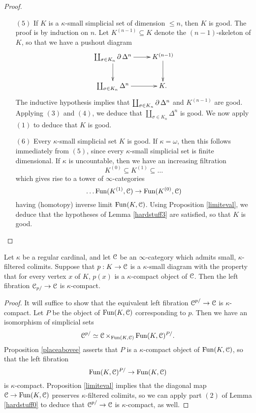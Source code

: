 \begin{proof}
\begin{itemize}
\item[$(5)$] If $K$ is a $\kappa$-small simplicial set of dimension $\leq n$, then $K$ is good. The proof is by induction on $n$. Let
$K^{(n-1)} \subseteq K$ denote the $(n-1)$-skeleton of $K$, so that we have a pushout diagram
$$ \xymatrix{ \coprod_{ \sigma \in K_n} \bd \Delta^n \ar[r] \ar[d] & K^{(n-1)} \ar[d] \\
\coprod_{\sigma \in K_n} \Delta^n \ar[r] & K.}$$
The inductive hypothesis implies that $\coprod_{\sigma \in K_n} \operatorname{\partial} \Delta^n$ and $K^{(n-1)}$
are good. Applying $(3)$ and $(4)$, we deduce that $\coprod_{\sigma \in K_n} \Delta^n$ is good. We now apply $(1)$ to deduce that $K$ is good.

\item[$(6)$] Every $\kappa$-small simplicial set $K$ is good. If $\kappa = \omega$, then this
follows immediately from $(5)$, since every $\kappa$-small simplicial set is finite dimensional.
If $\kappa$ is uncountable, then we have an increasing filtration
$$ K^{(0)} \subseteq K^{(1)} \subseteq \ldots $$
which gives rise to a tower of $\infty$-categories
$$ \ldots \operatorname{Fun}(K^{(1)}, \operatorname{\mathcal{C}}) \rightarrow \operatorname{Fun}(K^{(0)}, \operatorname{\mathcal{C}}) $$
having (homotopy) inverse limit $\operatorname{Fun}(K,\operatorname{\mathcal{C}})$. Using Proposition \ref{limiteval}, we deduce that the hypotheses of Lemma \ref{hardstuff3} are satisfied, so that $K$ is good.
\end{itemize}
\end{proof}

\begin{corollary}\label{jurman}
Let $\kappa$ be a regular cardinal, and let $\operatorname{\mathcal{C}}$ be an $\infty$-category which admits
small, $\kappa$-filtered colimits. Suppose that $p: K \rightarrow \operatorname{\mathcal{C}}$ is a $\kappa$-small diagram with the property that for every vertex $x$ of $K$, $p(x)$ is a $\kappa$-compact object of $\operatorname{\mathcal{C}}$.
Then the left fibration $\operatorname{\mathcal{C}}_{p/} \rightarrow \operatorname{\mathcal{C}}$ is $\kappa$-compact.
\end{corollary}

\begin{proof}
It will suffice to show that the equivalent left fibration $\operatorname{\mathcal{C}}^{p/ } \rightarrow \operatorname{\mathcal{C}}$
is $\kappa$-compact. Let $P$ be the object of $\operatorname{Fun}(K,\operatorname{\mathcal{C}})$ corresponding to $p$. Then
we have an isomorphism of simplicial sets $$\operatorname{\mathcal{C}}^{p/} \simeq \operatorname{\mathcal{C}} \times_{ \operatorname{Fun}(K,\operatorname{\mathcal{C}}) } \operatorname{Fun}(K,\operatorname{\mathcal{C}})^{P/}.$$ Proposition \ref{placeabovee} asserts that $P$ is a $\kappa$-compact object
of $\operatorname{Fun}(K,\operatorname{\mathcal{C}})$, so that the left fibration $$\operatorname{Fun}(K,\operatorname{\mathcal{C}})^{P/} \rightarrow \operatorname{Fun}(K,\operatorname{\mathcal{C}})$$ is $\kappa$-compact.
Proposition \ref{limiteval} implies that the diagonal map $\operatorname{\mathcal{C}} \rightarrow \operatorname{Fun}(K,\operatorname{\mathcal{C}})$ preserves $\kappa$-filtered colimits, so we can apply part $(2)$ of Lemma \ref{hardstuff0} to deduce that
$\operatorname{\mathcal{C}}^{p/} \rightarrow \operatorname{\mathcal{C}}$ is $\kappa$-compact, as well.
\end{proof}

